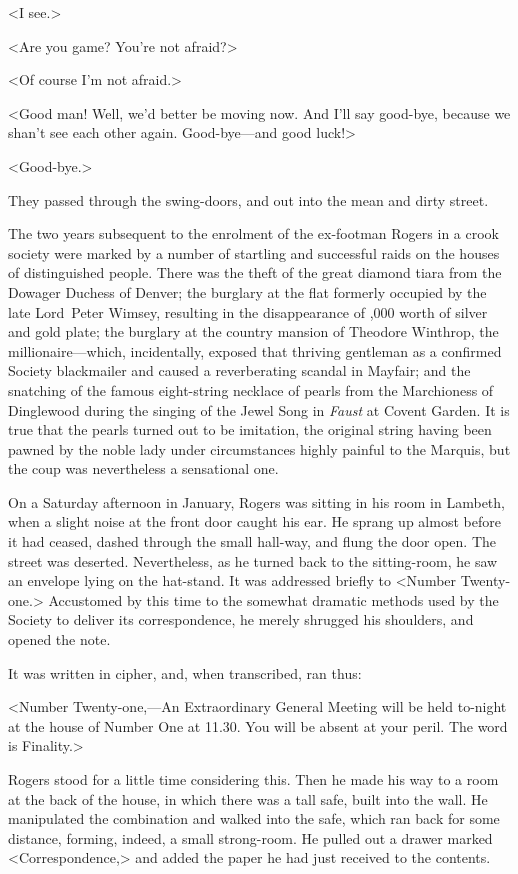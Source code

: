 <I see.>

<Are you game? You're not afraid?>

<Of course I'm not afraid.>

<Good man! Well, we'd better be moving now. And I'll say good-bye, because we shan't see each other again. Good-bye—and good luck!>

<Good-bye.>

They passed through the swing-doors, and out into the mean and dirty street.

The two years subsequent to the enrolment of the ex-footman Rogers in a crook society were marked by a number of startling and successful raids on the houses of distinguished people. There was the theft of the great diamond tiara from the Dowager Duchess of Denver; the burglary at the flat formerly occupied by the late Lord~Peter Wimsey, resulting in the disappearance of ,000 worth of silver and gold plate; the burglary at the country mansion of Theodore Winthrop, the millionaire—which, incidentally, exposed that thriving gentleman as a confirmed Society blackmailer and caused a reverberating scandal in Mayfair; and the snatching of the famous eight-string necklace of pearls from the Marchioness of Dinglewood during the singing of the Jewel Song in \textit{Faust} at Covent Garden. It is true that the pearls turned out to be imitation, the original string having been pawned by the noble lady under circumstances highly painful to the Marquis, but the coup was nevertheless a sensational one.

On a Saturday afternoon in January, Rogers was sitting in his room in Lambeth, when a slight noise at the front door caught his ear. He sprang up almost before it had ceased, dashed through the small hall-way, and flung the door open. The street was deserted. Nevertheless, as he turned back to the sitting-room, he saw an envelope lying on the hat-stand. It was addressed briefly to <Number Twenty-one.> Accustomed by this time to the somewhat dramatic methods used by the Society to deliver its correspondence, he merely shrugged his shoulders, and opened the note.

It was written in cipher, and, when transcribed, ran thus:

<Number Twenty-one,—An Extraordinary General Meeting will be held to-night at the house of Number One at 11.30. You will be absent at your peril. The word is Finality.>

Rogers stood for a little time considering this. Then he made his way to a room at the back of the house, in which there was a tall safe, built into the wall. He manipulated the combination and walked into the safe, which ran back for some distance, forming, indeed, a small strong-room. He pulled out a drawer marked <Correspondence,> and added the paper he had just received to the contents.

